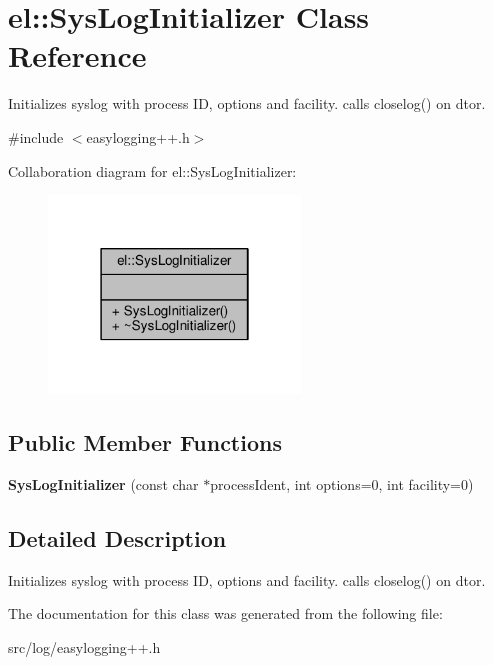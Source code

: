 \hypertarget{classel_1_1SysLogInitializer}{}\section{el\+:\+:Sys\+Log\+Initializer Class Reference}
\label{classel_1_1SysLogInitializer}


Initializes syslog with process ID, options and facility. calls closelog() on d\textquotesingle{}tor.  




{\ttfamily \#include $<$easylogging++.\+h$>$}



Collaboration diagram for el\+:\+:Sys\+Log\+Initializer\+:
\nopagebreak
\begin{figure}[H]
\begin{center}
\leavevmode
\includegraphics[width=190pt]{df/db1/classel_1_1SysLogInitializer__coll__graph}
\end{center}
\end{figure}
\subsection*{Public Member Functions}
\begin{DoxyCompactItemize}
\item 
{\bfseries Sys\+Log\+Initializer} (const char $\ast$process\+Ident, int options=0, int facility=0)\hypertarget{classel_1_1SysLogInitializer_aae71ee83f45c4cf770fbc6c6e87d9406}{}\label{classel_1_1SysLogInitializer_aae71ee83f45c4cf770fbc6c6e87d9406}

\end{DoxyCompactItemize}


\subsection{Detailed Description}
Initializes syslog with process ID, options and facility. calls closelog() on d\textquotesingle{}tor. 

The documentation for this class was generated from the following file\+:\begin{DoxyCompactItemize}
\item 
src/log/easylogging++.\+h\end{DoxyCompactItemize}

